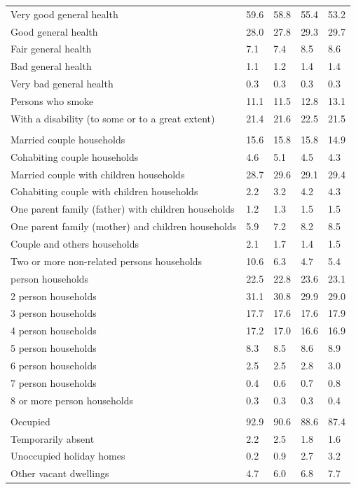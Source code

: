 \documentclass{article}
\begin{document}
\begin{table}[h]
\begin{tabular}{KTTTT}
    \hline
Very good general health & 59.6& 58.8&55.4& 53.2\\
Good general health & 28.0& 27.8& 29.3& 29.7\\
Fair general health & 7.1& 7.4&8.5& 8.6\\
Bad general health & 1.1& 1.2&1.4& 1.4\\
Very bad general health & 0.3& 0.3&0.3& 0.3\\
    \hline
Persons who smoke & 11.1& 11.5&12.8& 13.1\\
    \hline
With a disability (to some or to a great extent) & 21.4& 21.6&22.5& 21.5\\
\hline
    \\ 
    \hline
Married couple households & 15.6& 15.8& 15.8& 14.9\\
Cohabiting couple households & 4.6& 5.1& 4.5& 4.3\\
Married couple with children households & 28.7& 29.6& 29.1& 29.4\\
Cohabiting couple with children households & 2.2& 3.2& 4.2& 4.3\\
One parent family (father) with  children households & 1.2& 1.3& 1.5& 1.5\\
One parent family (mother) and children households & 5.9& 7.2& 8.2& 8.5\\
Couple and others households  & 2.1& 1.7& 1.4& 1.5\\
Two or more non-related persons households & 10.6&  6.3&  4.7&  5.4\\
     person households & 22.5& 22.8& 23.6& 23.1\\
2 person households & 31.1& 30.8& 29.9& 29.0\\
3 person households & 17.7& 17.6& 17.6& 17.9\\
4 person households & 17.2& 17.0& 16.6& 16.9\\
5 person households & 8.3& 8.5& 8.6& 8.9\\
6 person households & 2.5& 2.5& 2.8& 3.0\\
7 person households & 0.4& 0.6& 0.7& 0.8\\
8 or more person households & 0.3& 0.3& 0.3& 0.4\\
\hline
    \\ 
    \hline
Occupied & 92.9& 90.6& 88.6& 87.4\\
Temporarily absent & 2.2& 2.5& 1.8& 1.6\\
Unoccupied holiday homes & 0.2& 0.9& 2.7& 3.2\\
Other vacant dwellings & 4.7& 6.0& 6.8& 7.7\\
\hline
\end{tabular}
\end{table}
\end{document}
